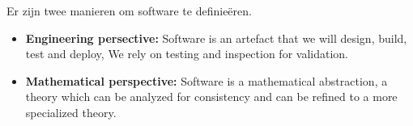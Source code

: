 \documentclass[../../main.tex]{subfiles}
\begin{document}
Er zijn twee manieren om software te definie\"eren.
\begin{itemize}
	\item \textbf{Engineering persective:} Software is an artefact that we will design, build, test and deploy, We rely on testing and inspection for validation.
	\item \textbf{Mathematical perspective:} Software is a mathematical abstraction, a theory which can be analyzed for consistency and can be refined to a more specialized theory.
\end{itemize}
\end{document}
